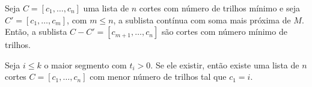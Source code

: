 \begin{theorem}
    Seja $C = [c_1, \ldots, c_n]$ uma lista de $n$ cortes com número de trilhos mínimo e seja $C' = [c_1, \ldots, c_m]$, com $m \leq n$, a sublista contínua com soma mais próxima de $M$. Então, a sublista $C - C' = [c_{m + 1}, \ldots, c_n]$ são cortes com número mínimo de trilhos.
\end{theorem}

\begin{theorem}
    Seja $i \leq k$ o maior segmento com $t_i > 0$. Se ele existir, então existe uma lista de $n$ cortes $C = [c_1, \ldots, c_n]$ com menor número de trilhos tal que $c_1 = i$.
\end{theorem}
